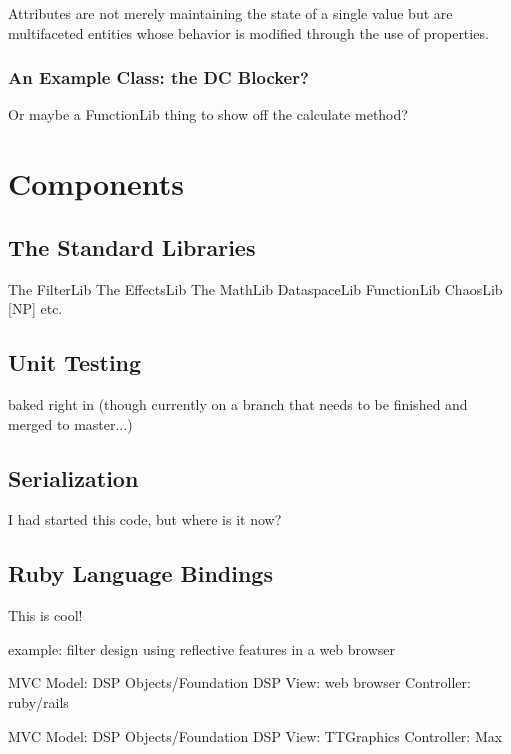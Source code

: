 \documentclass[twoside,10pt]{article}
\begin{document}
Attributes are not merely maintaining the state of a single value but are multifaceted entities whose behavior is modified through the use of properties\cite{Place:2008params}.


\subsubsection{An Example Class: the DC Blocker?}

Or maybe a FunctionLib thing to show off the calculate method?



\section{Components} %

\subsection{The Standard Libraries}

The FilterLib
The EffectsLib
The MathLib
DataspaceLib
FunctionLib 
ChaosLib [NP]
etc.

\subsection{Unit Testing}

baked right in (though currently on a branch that needs to be finished and merged to master...)


\subsection{Serialization}

I had started this code, but where is it now?


\subsection{Ruby Language Bindings}

This is cool!

example: filter design using reflective features in a web browser

MVC
    Model: DSP Objects/Foundation DSP
    View: web browser
    Controller: ruby/rails

MVC
    Model: DSP Objects/Foundation DSP
    View: TTGraphics
    Controller: Max
\end{document}
